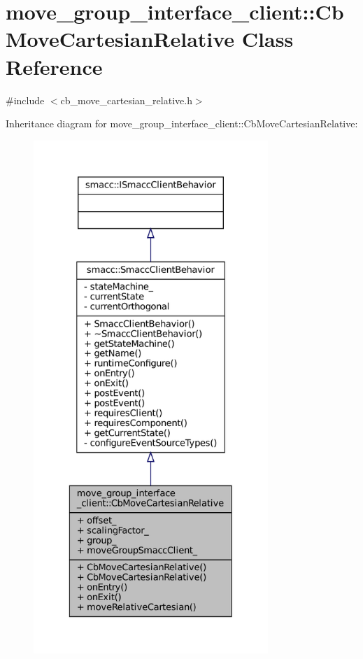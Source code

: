 \hypertarget{classmove__group__interface__client_1_1CbMoveCartesianRelative}{}\section{move\+\_\+group\+\_\+interface\+\_\+client\+:\+:Cb\+Move\+Cartesian\+Relative Class Reference}
\label{classmove__group__interface__client_1_1CbMoveCartesianRelative}


{\ttfamily \#include $<$cb\+\_\+move\+\_\+cartesian\+\_\+relative.\+h$>$}



Inheritance diagram for move\+\_\+group\+\_\+interface\+\_\+client\+:\+:Cb\+Move\+Cartesian\+Relative\+:
\nopagebreak
\begin{figure}[H]
\begin{center}
\leavevmode
\includegraphics[height=550pt]{classmove__group__interface__client_1_1CbMoveCartesianRelative__inherit__graph}
\end{center}
\end{figure}


